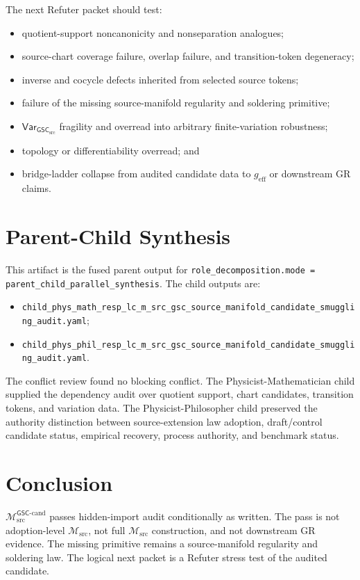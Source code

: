 \documentclass[11pt]{article}
\newcommand{\Msrc}{\mathcal{M}_{\mathrm{src}}}
\newcommand{\Mgsccand}{\mathcal{M}_{\mathrm{src}}^{\mathsf{GSC}\text{-}\mathrm{cand}}}
\newcommand{\geff}{g_{\mathrm{eff}}}
\newcommand{\GSC}{\mathsf{GSC}_{\mathrm{src}}}
\newcommand{\Vargsc}{\mathsf{Var}_{\GSC}}
\begin{document}
The next Refuter packet should test:
\begin{itemize}
  \item quotient-support noncanonicity and nonseparation analogues;
  \item source-chart coverage failure, overlap failure, and transition-token
  degeneracy;
  \item inverse and cocycle defects inherited from selected source tokens;
  \item failure of the missing source-manifold regularity and soldering
  primitive;
  \item \(\Vargsc\) fragility and overread into arbitrary finite-variation
  robustness;
  \item topology or differentiability overread; and
  \item bridge-ladder collapse from audited candidate data to \(\geff\) or
  downstream GR claims.
\end{itemize}

\section{Parent-Child Synthesis}

This artifact is the fused parent output for
\texttt{role\_decomposition.mode = parent\_child\_parallel\_synthesis}. The
child outputs are:
\begin{itemize}
  \item \texttt{child\_phys\_math\_resp\_lc\_m\_src\_gsc\_source\_manifold\_candidate\_smuggling\_audit.yaml};
  \item \texttt{child\_phys\_phil\_resp\_lc\_m\_src\_gsc\_source\_manifold\_candidate\_smuggling\_audit.yaml}.
\end{itemize}
The conflict review found no blocking conflict. The
Physicist-Mathematician child supplied the dependency audit over quotient
support, chart candidates, transition tokens, and variation data. The
Physicist-Philosopher child preserved the authority distinction between
source-extension law adoption, draft/control candidate status, empirical
recovery, process authority, and benchmark status.

\section{Conclusion}

\(\Mgsccand\) passes hidden-import audit conditionally as written. The pass is
not adoption-level \(\Msrc\), not full \(\Msrc\) construction, and not
downstream GR evidence. The missing primitive remains a source-manifold
regularity and soldering law. The logical next packet is a Refuter stress
test of the audited candidate.
\end{document}
